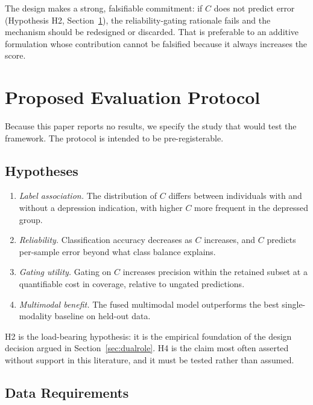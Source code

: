 \documentclass[12pt]{article}
\begin{document}
The design makes a strong, falsifiable commitment: if $C$ does not
predict error (Hypothesis H2, Section~\ref{sec:evaluation}), the
reliability-gating rationale fails and the mechanism should be
redesigned or discarded. That is preferable to an additive formulation
whose contribution cannot be falsified because it always increases the
score.

\section{Proposed Evaluation Protocol}
\label{sec:evaluation}

Because this paper reports no results, we specify the study that would
test the framework. The protocol is intended to be pre-registerable.

\subsection{Hypotheses}

\begin{enumerate}
  \item[\textbf{H1}] \emph{Label association.} The distribution of $C$
        differs between individuals with and without a depression
        indication, with higher $C$ more frequent in the depressed
        group.
  \item[\textbf{H2}] \emph{Reliability.} Classification accuracy
        decreases as $C$ increases, and $C$ predicts per-sample error
        beyond what class balance explains.
  \item[\textbf{H3}] \emph{Gating utility.} Gating on $C$ increases
        precision within the retained subset at a quantifiable cost in
        coverage, relative to ungated predictions.
  \item[\textbf{H4}] \emph{Multimodal benefit.} The fused multimodal
        model outperforms the best single-modality baseline on held-out
        data.
\end{enumerate}

H2 is the load-bearing hypothesis: it is the empirical foundation of the
design decision argued in Section~\ref{sec:dualrole}. H4 is the claim
most often asserted without support in this literature, and it must be
tested rather than assumed.

\subsection{Data Requirements}
\end{document}
